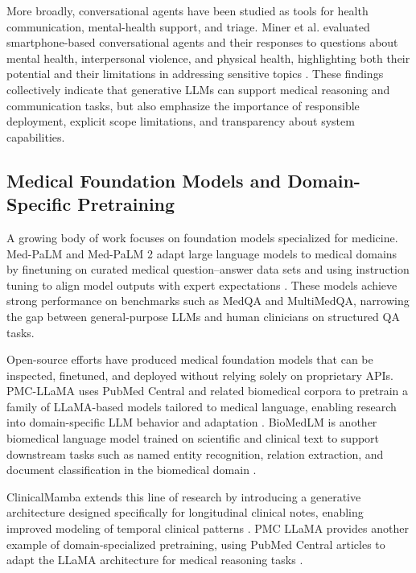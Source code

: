 More broadly, conversational agents have been studied as tools for health communication, mental-health support, and triage. Miner et al. evaluated smartphone-based conversational agents and their responses to questions about mental health, interpersonal violence, and physical health, highlighting both their potential and their limitations in addressing sensitive topics \cite{miner2016smartphone}. These findings collectively indicate that generative LLMs can support medical reasoning and communication tasks, but also emphasize the importance of responsible deployment, explicit scope limitations, and transparency about system capabilities.

\subsection{Medical Foundation Models and Domain-Specific Pretraining}

A growing body of work focuses on foundation models specialized for medicine. Med-PaLM and Med-PaLM 2 adapt large language models to medical domains by finetuning on curated medical question–answer data sets and using instruction tuning to align model outputs with expert expectations \cite{singhal2025toward}. These models achieve strong performance on benchmarks such as MedQA and MultiMedQA, narrowing the gap between general-purpose LLMs and human clinicians on structured QA tasks.

Open-source efforts have produced medical foundation models that can be inspected, finetuned, and deployed without relying solely on proprietary APIs. PMC-LLaMA uses PubMed Central and related biomedical corpora to pretrain a family of LLaMA-based models tailored to medical language, enabling research into domain-specific LLM behavior and adaptation \cite{wu2024pmcllama}. BioMedLM is another biomedical language model trained on scientific and clinical text to support downstream tasks such as named entity recognition, relation extraction, and document classification in the biomedical domain \cite{bolton2024biomedlm}.

ClinicalMamba extends this line of research by introducing a generative architecture designed specifically for longitudinal clinical notes, enabling improved modeling of temporal clinical patterns \cite{yang2024clinicalmamba}. PMC LLaMA provides another example of domain-specialized pretraining, using PubMed Central articles to adapt the LLaMA architecture for medical reasoning tasks \cite{wu2024pmcllama}.

